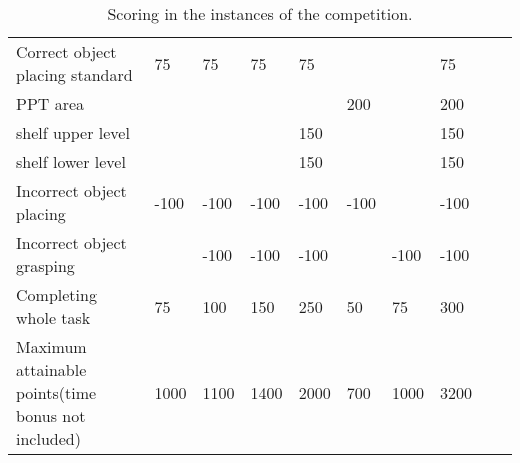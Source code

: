 \begin{landscape}
\begin{table}
\begin{tabular}{|p{5.5cm}*{9}{|P{1cm}}|}
   Correct object placing standard             &   75   &   75   &   75   &   75   &        &        &   75   \\
	 \hspace{0.5cm} PPT area                     &        &        &        &        &  200   &        &  200   \\
	 \hspace{0.5cm} shelf upper level            &        &        &        &  150   &        &        &  150   \\
	 \hspace{0.5cm} shelf lower level            &        &        &        &  150   &        &        &  150   \\ \hline
   Incorrect object placing                    & -100   & -100   & -100   & -100   & -100   &        & -100   \\
   Incorrect object grasping                   &        & -100   & -100   & -100   &        & -100   & -100   \\
   Completing whole task                       &   75   &  100   &  150   &  250   &   50   &   75   &  300   \\ \hline\hline
   Maximum attainable points\newline (time bonus not included)
	                                             & 1000   & 1100   & 1400   &  2000  &  700   &  1000  &  3200  \\ \hline
 \end{tabular}
 \caption{Scoring in the instances of the \RCAW \YEAR competition.}
  \label{tab:InstancePoints}
\end{table}
\end{landscape}
